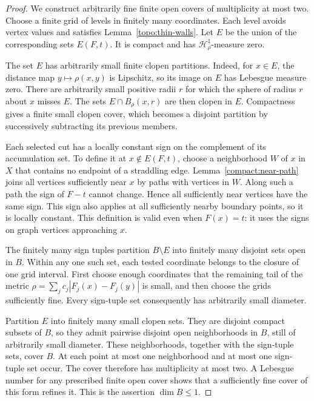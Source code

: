 \begin{proof}
We construct arbitrarily fine finite open covers of multiplicity at most
two.  Choose a finite grid of levels in finitely many coordinates.  Each
level avoids vertex values and satisfies Lemma~\ref{topo:thin-walls}.
Let $E$ be the union of the corresponding sets $E(F,t)$.  It is compact
and has $\mathcal H^1_\rho$-measure zero.

The set $E$ has arbitrarily small finite clopen partitions.  Indeed, for
$x\in E$, the distance map $y\mapsto\rho(x,y)$ is Lipschitz, so its image
on $E$ has Lebesgue measure zero.  There are arbitrarily small positive
radii $r$ for which the sphere of radius $r$ about $x$ misses $E$.
The sets $E\cap B_\rho(x,r)$ are then clopen in $E$.  Compactness gives a
finite small clopen cover, which becomes a disjoint partition by
successively subtracting its previous members.

Each selected cut has a locally constant sign on the complement of its
accumulation set.  To define it at $x\notin E(F,t)$, choose a neighborhood
$W$ of $x$ in $X$ that contains no endpoint of a straddling edge.
Lemma~\ref{compact:near-path} joins all vertices sufficiently near $x$
by paths with vertices in $W$.  Along such a path the sign of $F-t$
cannot change.  Hence all sufficiently near vertices have the same sign.
This sign also applies at all sufficiently nearby boundary points,
so it is locally constant.  This definition is valid even when
$F(x)=t$: it uses the signs on graph vertices approaching $x$.

The finitely many sign tuples partition $B\setminus E$ into finitely many
disjoint sets open in $B$.  Within any one such set, each tested
coordinate belongs to the closure of one grid interval.  First choose
enough coordinates that the remaining tail of the metric
$\rho=\sum_j c_j|F_j(x)-F_j(y)|$ is small, and then choose the grids sufficiently
fine.  Every sign-tuple set consequently has arbitrarily small diameter.

Partition $E$ into finitely many small clopen sets.  They are disjoint
compact subsets of $B$, so they admit pairwise disjoint open neighborhoods
in $B$, still of arbitrarily small diameter.  These neighborhoods,
together with the sign-tuple sets, cover $B$.  At each point at most one
neighborhood and at most one sign-tuple set occur.  The cover therefore
has multiplicity at most two.  A Lebesgue number for any prescribed
finite open cover shows that a sufficiently fine cover of this form
refines it.  This is the assertion $\dim B\le1$.
\end{proof}

